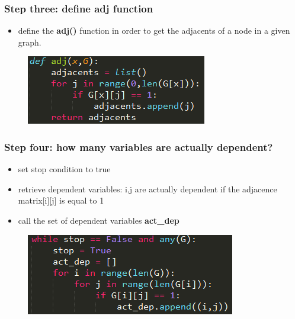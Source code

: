\documentclass[xcolor ={table,usenames,dvipsnames}]{beamer}
\theoremstyle{definition}
\begin{document}
\begin{frame}
\frametitle{Step three: define adj function}
\begin{itemize}
	\item define the \textbf{adj()} function in order to get the adjacents of a node in a given graph.
\end{itemize}
	\begin{figure}[h!]
		\centering
		\includegraphics[scale=0.9]{img/adj.PNG}
	\end{figure}

\end{frame}
\begin{frame}
\frametitle{Step four: how many variables are actually dependent?}
\begin{itemize}
	\item set stop condition to true
	\item retrieve dependent variables: i,j are actually dependent if the adjacence matrix[i][j] is equal to 1
	\item call the set of dependent variables \textbf{act\_dep}
\end{itemize}
	\begin{figure}[h!]
		\centering
		\includegraphics[scale=0.8]{img/depvar.PNG}
	\end{figure}

\end{frame}
\end{document}
